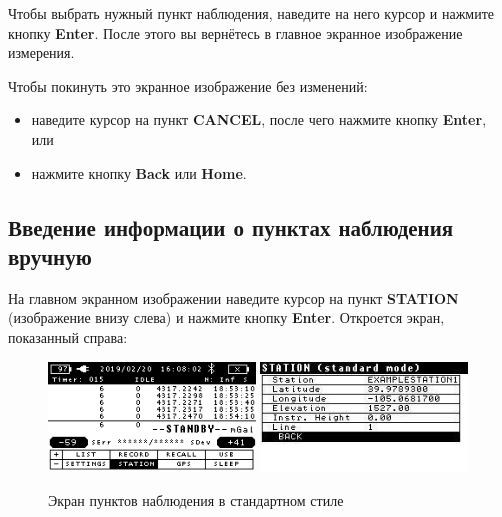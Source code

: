Чтобы выбрать нужный пункт наблюдения, наведите на него курсор и нажмите кнопку
\textbf{Enter}. После этого вы вернётесь в главное экранное изображение
измерения.

Чтобы покинуть это экранное изображение без изменений:
\begin{itemize}
  \item наведите курсор на пункт \textbf{CANCEL}, после чего нажмите кнопку
    \textbf{Enter}, или

  \item нажмите кнопку \textbf{Back} или \textbf{Home}.
\end{itemize}



\subsection{Введение информации о пунктах наблюдения вручную}

На главном экранном изображении наведите курсор на пункт \textbf{STATION}
(изображение внизу слева) и нажмите кнопку \textbf{Enter}. Откроется экран,
показанный справа:

\begin{figure}[h]
  \centering
  \includegraphics[width=0.49\textwidth]{figures/station_screen_under_standard_station_style_1}
  \includegraphics[width=0.49\textwidth]{figures/station_screen_under_standard_station_style_2}
  \caption{Экран пунктов наблюдения в стандартном стиле}
  \label{fig:station_screen_under_standard_station_style}
\end{figure}

